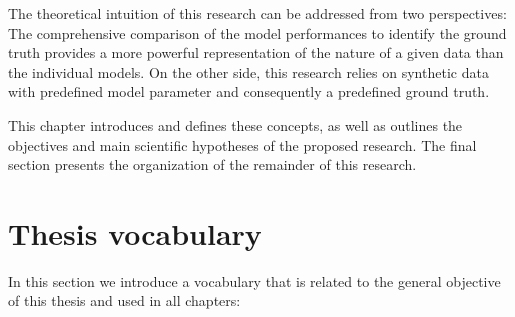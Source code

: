 The theoretical intuition of this research can be addressed from two perspectives: The comprehensive comparison of the model performances to identify the ground truth provides a more powerful representation of the nature of a given data than the individual models. On the other side, this research relies on synthetic data with predefined model parameter and consequently a predefined ground truth. 



This chapter introduces and defines these concepts, as well as outlines the objectives and main scientific hypotheses of the proposed research. The final section presents the organization of the remainder of this research.

\section{Thesis vocabulary}
\label{Vocabl}

In this section we introduce a vocabulary that is related to the general objective of this thesis and used in all chapters:

